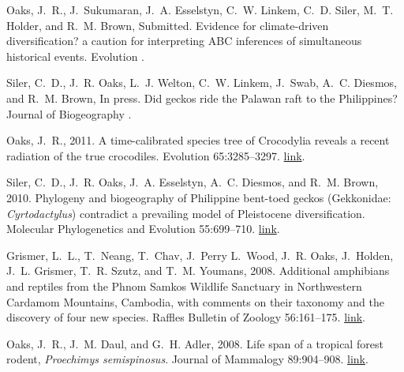 \documentclass[10pt]{article}
\begin{document}
\renewcommand{\refname}{{\bfseries\itshape\normalsize {Publications:}}}
%
\begin{thebibliography}{6}
\providecommand{\natexlab}[1]{#1}
\providecommand{\url}[1]{\texttt{#1}}
\providecommand{\urlprefix}{URL }

Oaks, J.~R., J.~Sukumaran, J.~A. Esselstyn, C.~W. Linkem, C.~D. Siler, M.~T.
  Holder, and R.~M. Brown, Submitted.
\newblock Evidence for climate-driven diversification? a caution for
  interpreting {ABC} inferences of simultaneous historical events.
\newblock Evolution .

Siler, C.~D., J.~R. Oaks, L.~J. Welton, C.~W. Linkem, J.~Swab, A.~C. Diesmos,
  and R.~M. Brown, In press.
\newblock Did geckos ride the {P}alawan raft to the {P}hilippines?
\newblock Journal of Biogeography .

Oaks, J.~R., 2011.
\newblock A time-calibrated species tree of {C}rocodylia reveals a recent
  radiation of the true crocodiles.
\newblock Evolution 65:3285--3297.
\newblock
  \href{http://onlinelibrary.wiley.com/doi/10.1111/j.1558-5646.2011.01373.x/abstract}{link}.

Siler, C.~D., J.~R. Oaks, J.~A. Esselstyn, A.~C. Diesmos, and R.~M. Brown,
  2010.
\newblock Phylogeny and biogeography of {P}hilippine bent-toed geckos
  ({G}ekkonidae: \emph{{C}yrtodactylus}) contradict a prevailing model of
  {P}leistocene diversification.
\newblock Molecular Phylogenetics and Evolution 55:699--710.
\newblock
  \href{http://www.sciencedirect.com/science/article/pii/S1055790310000382}{link}.

Grismer, L.~L., T.~Neang, T.~Chav, J.~Perry L.~Wood, J.~R. Oaks, J.~Holden,
  J.~L. Grismer, T.~R. Szutz, and T.~M. Youmans, 2008.
\newblock Additional amphibians and reptiles from the {P}hnom {S}amkos
  {W}ildlife {S}anctuary in {N}orthwestern {C}ardamom {M}ountains, {C}ambodia,
  with comments on their taxonomy and the discovery of four new species.
\newblock Raffles Bulletin of Zoology 56:161--175.
\newblock
  \href{http://rmbr.nus.edu.sg/rbz/biblio/56/56rbz161-175.pdf}{link}.

Oaks, J.~R., J.~M. Daul, and G.~H. Adler, 2008.
\newblock Life span of a tropical forest rodent, \emph{{P}roechimys
  semispinosus}.
\newblock Journal of Mammalogy 89:904--908.
\newblock \href{http://dx.doi.org/10.1644/07-MAMM-A-045.1}{link}.

\end{thebibliography}
\end{document}
